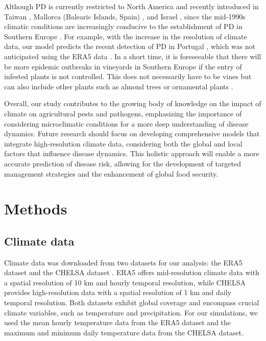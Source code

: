 Although PD is currently restricted to North America and recently
introduced in Taiwan \cite{su2013pierce}, Mallorca (Balearic Islands, Spain)
\cite{gomila2019draft,Moralejo2019}, and Israel
\cite{zecharia2022xylella}, since the mid-1990s climatic conditions are
increasingly conducive to the establishment of PD in Southern Europe
\cite{GimenezRomero2022_CommsBio}. For example, with the increase in the
resolution of climate data, our model predicts the recent detection of PD in
Portugal \cite{loureiro2023xylella}, which was not anticipated using the ERA5
data \cite{GimenezRomero2022_CommsBio}. In a short time, it is foreseeable that
there will be more epidemic outbreaks in vineyards in Southern Europe if the
entry of infested plants is not controlled. This does not necessarily have to
be vines but can also include other plants such as almond trees or ornamental
plants \cite{Moralejo2020}.

Overall, our study contributes to the growing body of knowledge on the
impact of climate on agricultural pests and pathogens, emphasizing the
importance of considering microclimatic conditions for a more deep
understanding of disease dynamics. Future research should focus on developing
comprehensive models that integrate high-resolution climate data, considering
both the global and local factors that influence disease dynamics. This
holistic approach will enable a more accurate prediction of disease risk,
allowing for the development of targeted management strategies and the
enhancement of global food security.

\section{Methods}

\subsection{Climate data}

Climate data was downloaded from two datasets for our analysis: the ERA5
dataset \cite{munoz-sabater_era5-land_2021, ERA5_dataset} and the CHELSA
dataset \cite{Karger2017, chelsa-climatologies-2021}. ERA5 offers
mid-resolution climate data with a spatial resolution of 10 km and hourly
temporal resolution, while CHELSA provides high-resolution data with a spatial
resolution of 1 km and daily temporal resolution. Both datasets exhibit global
coverage and encompass crucial climate variables, such as temperature and
precipitation. For our simulations, we used the mean hourly temperature data
from the ERA5 dataset and the maximum and minimum daily temperature data from
the CHELSA dataset.

